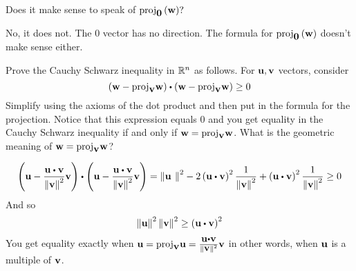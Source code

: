 \begin{enumialphparenastyle}
\begin{ex} Does it make sense to speak of $\mbox{\rm proj}_{\mbox{\bf 0}}\left(\mbox{\bf w}\right) ?$
\begin{sol}
No, it does not. The $0$ vector has no direction. The formula for $\mbox{\rm proj}_{\mbox{\bf 0}}\left(\mbox{\bf w}\right)$ doesn't make sense either.
\end{sol}
\end{ex}

\begin{ex} Prove the Cauchy Schwarz inequality in $\mathbb{R}^{n}$ as follows.
For $\mbox{\bf u},\mbox{\bf v}$ vectors, consider 
\begin{equation*}
\tup{\vect{w}-
\func{proj}_{\vect{v}}\vect{w}} \dotprod \tup{\vect{w}-
\func{proj}_{\vect{v}}\vect{w}} \geq 0
\end{equation*}
Simplify using the axioms of the dot product and then put in the formula
for the projection. Notice that this expression equals $0$ and you get equality
in the Cauchy Schwarz inequality if and only if 
$\mbox{\bf w}=\mbox{\rm proj}_{\mbox{\bf v}}\mbox{\bf w}$. What is the geometric meaning of 
$\mbox{\bf w}=\mbox{\rm proj}_{\mbox{\bf v}}\mbox{\bf w}$?
\begin{sol}
\[
\tup{\vect{u}-\frac{\vect{u}\dotprod \vect{v}}{\norm{\vect{v}}
^{2}}\vect{v}} \dotprod \tup{\vect{u}-\frac{\vect{u}\dotprod \vect{v}}{\norm{\vect{v}} ^{2}}\vect{v}} =\norm{\vect{u
}} ^{2}-2\tup{\vect{u}\dotprod \vect{v}} ^{2}\frac{1}{\norm{
\vect{v}} ^{2}}+\tup{\vect{u}\dotprod \vect{v}} ^{2}\frac{1}{
\norm{\vect{v}} ^{2}}\geq 0
\]
And so
\[
\norm{\vect{u}} ^{2}\norm{\vect{v}}
^{2}\geq \tup{\vect{u}\dotprod \vect{v}} ^{2}
\]
You get equality exactly when $\vect{u}=\func{proj}_{\vect{v}}\vect{u}
= \frac{\vect{u}\dotprod \vect{v}}{\norm{\vect{v}} ^{2}}\vect{v}$
in other words, when $\mbox{\bf u}$ is a multiple of $\mbox{\bf v}$.
\end{sol}
\end{ex}



\end{enumialphparenastyle}
